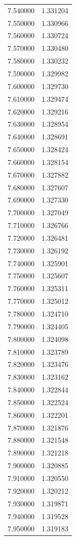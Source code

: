 \begin{tabular}{rr}
7.540000 & 1.331204 \\
7.550000 & 1.330966 \\
7.560000 & 1.330724 \\
7.570000 & 1.330480 \\
7.580000 & 1.330232 \\
7.590000 & 1.329982 \\
7.600000 & 1.329730 \\
7.610000 & 1.329474 \\
7.620000 & 1.329216 \\
7.630000 & 1.328954 \\
7.640000 & 1.328691 \\
7.650000 & 1.328424 \\
7.660000 & 1.328154 \\
7.670000 & 1.327882 \\
7.680000 & 1.327607 \\
7.690000 & 1.327330 \\
7.700000 & 1.327049 \\
7.710000 & 1.326766 \\
7.720000 & 1.326481 \\
7.730000 & 1.326192 \\
7.740000 & 1.325901 \\
7.750000 & 1.325607 \\
7.760000 & 1.325311 \\
7.770000 & 1.325012 \\
7.780000 & 1.324710 \\
7.790000 & 1.324405 \\
7.800000 & 1.324098 \\
7.810000 & 1.323789 \\
7.820000 & 1.323476 \\
7.830000 & 1.323162 \\
7.840000 & 1.322844 \\
7.850000 & 1.322524 \\
7.860000 & 1.322201 \\
7.870000 & 1.321876 \\
7.880000 & 1.321548 \\
7.890000 & 1.321218 \\
7.900000 & 1.320885 \\
7.910000 & 1.320550 \\
7.920000 & 1.320212 \\
7.930000 & 1.319871 \\
7.940000 & 1.319528 \\
7.950000 & 1.319183 \\

\end{tabular}
